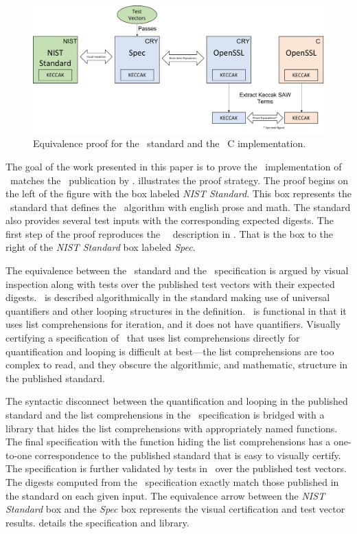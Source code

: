 \begin{figure}[t]
  \centering
  \includegraphics[width=\linewidth]{figs/proof.png}
  
  \caption{Equivalence proof for the \shaThree\ standard and the \openssl\ C implementation.}
  \label{fig:proofStructure}
  
\end{figure}

The goal of the work presented in this paper is to prove the \openssl\ implementation of \shaThree\ matches the \fips\ publication by \nist.
 illustrates the proof strategy.
The proof begins on the left of the figure with the box labeled \emph{NIST Standard}. 
This box represents the \fips\ standard that defines the \shaThree\ algorithm with english prose and math.
The standard also provides several test inputs with the corresponding expected digests.
The first step of the proof reproduces the \fips\ \shaThree\ description in \cryptol.
That is the box to the right of the \emph{NIST Standard} box labeled \emph{Spec}.

The equivalence between the \fips\ standard and the \cryptol\ specification is argued by visual inspection along with tests over the published test vectors with their expected digests.
\shaThree\ is described algorithmically in the standard making use of universal quantifiers and other looping structures in the definition.
\cryptol\ is functional in that it uses list comprehensions for iteration, and it does not have quantifiers.
Visually certifying a specification of \shaThree\ that uses list comprehensions directly for quantification and looping is difficult at best---the list comprehensions are too complex to read, and they obscure the algorithmic, and mathematic, structure in the published standard.

The syntactic disconnect between the quantification and looping in the published standard and the list comprehensions in the \cryptol\ specification is bridged with a library that hides the list comprehensions with appropriately named functions.
The final specification with the function hiding the list comprehensions has a one-to-one correspondence to the published standard that is easy to visually certify.
The specification is further validated by tests in \cryptol\ over the published test vectors.
The digests computed from the \cryptol\ specification exactly match those published in the standard on each given input.
The equivalence arrow between the \emph{NIST Standard} box and the \emph{Spec} box represents the visual certification and test vector results.
 details the specification and library.

